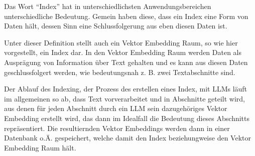 \documentclass[../main.tex]{subfiles}
\begin{document}
Das Wort \enquote{Index} hat in unterschiedlichsten Anwendungsbereichen unterschiedliche Bedeutung.
Gemein haben diese, dass ein Index eine Form von Daten hält, dessen Sinn eine Schlussfolgerung aus eben diesen Daten ist.
\cite{Chatterjee2017Index,Lo2016What,Vickery1950THE}

Unter dieser Definition stellt auch ein Vektor Embedding Raum, so wie hier vorgestellt, ein Index dar.
In den Vektor Embedding Raum werden Daten als Ausprägung von Information über Text gehalten und es kann aus diesen Daten geschlussfolgert werden, wie bedeutungsnah z. B. zwei Textabschnitte sind.

Der Ablauf des Indexing, der Prozess des erstellen eines Index, mit \glspl{LLM} läuft im allgemeinen so ab, dass Text vorverarbeitet und in Abschnitte geteilt wird, aus denen für jeden Abschnitt durch ein \gls{LLM} sein  dazugehöriges Vektor Embedding erstellt wird, das dann im Idealfall die Bedeutung dieses Abschnitts repräsentiert.
Die resultiernden Vektor Embeddings werden dann in einer Datenbank o.Ä. gespeichert, welche damit den Index beziehungweise den Vektor Embedding Raum hält.
\cite{ji2022speeding}
\end{document}
